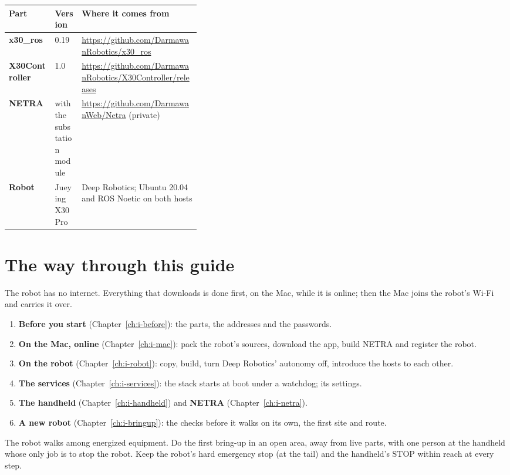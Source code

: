 \begin{center}
\begin{tabularx}{\linewidth}{@{}>{\bfseries}p{0.24\linewidth}p{0.14\linewidth}X@{}}
  \toprule
  Part & Version & Where it comes from \\
  \midrule
  x30\_ros & 0.19 & \url{https://github.com/DarmawanRobotics/x30_ros} \\
  X30Controller & 1.0 & \url{https://github.com/DarmawanRobotics/X30Controller/releases} \\
  NETRA & with the substation module & \url{https://github.com/DarmawanWeb/Netra} (private) \\
  Robot & Jueying X30 Pro & Deep Robotics; Ubuntu 20.04 and ROS Noetic on both hosts \\
  \bottomrule
\end{tabularx}
\end{center}

\section{The way through this guide}

The robot has no internet. Everything that downloads is done first, on the Mac, while it is
online; then the Mac joins the robot's Wi-Fi and carries it over.

\begin{enumerate}
  \item \textbf{Before you start} (Chapter~\ref{ch:i-before}): the parts, the addresses and the
    passwords.
  \item \textbf{On the Mac, online} (Chapter~\ref{ch:i-mac}): pack the robot's sources, download
    the app, build NETRA and register the robot.
  \item \textbf{On the robot} (Chapter~\ref{ch:i-robot}): copy, build, turn Deep Robotics'
    autonomy off, introduce the hosts to each other.
  \item \textbf{The services} (Chapter~\ref{ch:i-services}): the stack starts at boot under a
    watchdog; its settings.
  \item \textbf{The handheld} (Chapter~\ref{ch:i-handheld}) and \textbf{NETRA}
    (Chapter~\ref{ch:i-netra}).
  \item \textbf{A new robot} (Chapter~\ref{ch:i-bringup}): the checks before it walks on its own,
    the first site and route.
\end{enumerate}

\begin{dangerbox}[Safety]
The robot walks among energized equipment. Do the first bring-up in an open area, away from
live parts, with one person at the handheld whose only job is to stop the robot. Keep the
robot's hard emergency stop (at the tail) and the handheld's STOP within reach at every step.
\end{dangerbox}
